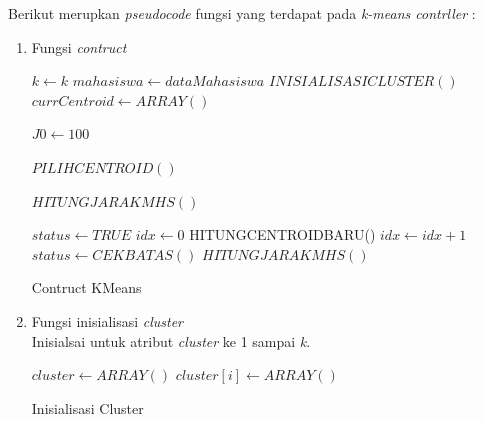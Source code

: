 Berikut merupkan \textit{pseudocode} fungsi yang terdapat pada \textit{k-means contrller} :

\begin{enumerate}
    \item Fungsi \textit{contruct} \\
    
        \begin{algorithm}[H]
            \begin{algorithmic}[1]
                    \State $k \gets k$
                    \State $mahasiswa \gets dataMahasiswa$
                    \State $INISIALISASICLUSTER()$
                    \State $currCentroid \gets ARRAY()$ 
                    
                    \State $J0 \gets 100$ 
                    
                    \State $PILIHCENTROID()$
                    
                    \State $HITUNGJARAKMHS()$
                    
                    \State $status \gets TRUE$
                    \State $ idx \gets 0$
                        \State HITUNGCENTROIDBARU()
                        \State $idx \gets idx + 1$
                        \State $status \gets CEKBATAS()$
                        \State $HITUNGJARAKMHS()$
                    \EndWhile
                \EndProcedure
            \end{algorithmic} 
            \caption{Contruct KMeans}
            \label{alg:Contruct kmeans}
        \end{algorithm}

    
    \item Fungsi inisialisasi \textit{cluster} \\
        Inisialsai untuk atribut \textit{cluster} ke 1 sampai \textit{k}. \\
        
        \begin{algorithm}[H]
            \begin{algorithmic}[1]
                    \State $cluster \gets ARRAY()$
                        \State $cluster[i] \gets ARRAY()$
                    \EndFor
                \EndProcedure
            \end{algorithmic} 
            \caption{Inisialisasi Cluster}
            \label{alg:inisialisasi cluster}
        \end{algorithm}
        

\end{enumerate}
